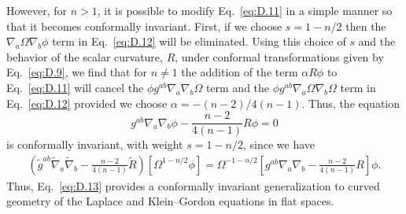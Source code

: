 However, for \(n>1\), it is possible to modify Eq.~\eqref{eq:D.11} in a simple
manner so that it becomes conformally invariant. First, if we choose
\(s=1-n/2\) then the \(\nabla_a\Omega\nabla_b\phi\) term in Eq.~\eqref{eq:D.12}
will be eliminated. Using this choice of \(s\) and the behavior of the scalar
curvature, \(R\), under conformal transformations given by Eq.~\eqref{eq:D.9}, we
find that for \(n\ne1\) the addition of the term \(\alpha R\phi\) to
Eq.~\eqref{eq:D.11} will cancel the \(\phi g^{ab}\nabla_a\nabla_b\Omega\) term and
the \(\phi g^{ab}\nabla_a\Omega\nabla_b\Omega\) term in Eq.~\eqref{eq:D.12}
provided we choose \(\alpha=-(n-2)/4(n-1)\). Thus, the equation
\begin{equation}
  g^{ab}\nabla_a\nabla_b\phi-\frac{n-2}{4(n-1)}R\phi=0
  \tag{D.13}\label{eq:D.13}
\end{equation}
is conformally invariant, with weight \(s=1-n/2\), since we have
\begin{equation}
\begin{aligned}
  \left(\widetilde g^{ab}\widetilde\nabla_a\widetilde\nabla_b
  -\frac{n-2}{4(n-1)}\widetilde R\right)[\Omega^{1-n/2}\phi]
  =\Omega^{-1-n/2}
  \left[g^{ab}\nabla_a\nabla_b-\frac{n-2}{4(n-1)}R\right]\phi.
\end{aligned}
  \tag{D.14}\label{eq:D.14}
\end{equation}
Thus, Eq.~\eqref{eq:D.13} provides a conformally invariant generalization to curved
geometry of the Laplace and Klein--Gordon equations in flat spaces.

